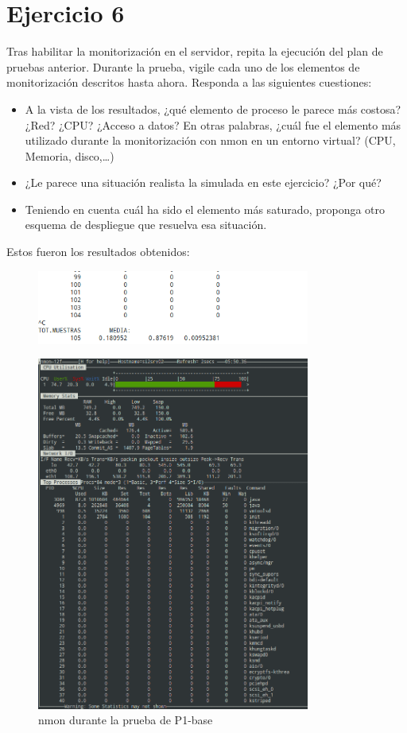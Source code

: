 \documentclass[a4paper, 10pt]{article}
\begin{document}
\section{Ejercicio 6}
\begin{mdframed} 
Tras habilitar la monitorización en el servidor, repita la ejecución del plan de pruebas 
anterior. Durante la prueba, vigile cada uno de los elementos de monitorización descritos hasta 
ahora. Responda a las siguientes cuestiones: 
\begin{itemize}
\item A la vista de los resultados, ¿qué elemento de proceso le parece más costosa? ¿Red? ¿CPU? 
¿Acceso a datos? En otras palabras, ¿cuál fue el elemento más utilizado durante la monitorización 
con nmon en un entorno virtual? (CPU, Memoria, disco,…) 
\item ¿Le parece una situación realista la simulada en este ejercicio? ¿Por qué? 
\item Teniendo en cuenta cuál ha sido el elemento más saturado, proponga otro esquema de despliegue 
que resuelva esa situación.
\end{itemize}
\end{mdframed}
Estos fueron los resultados obtenidos:
\begin{figure}[hbtp]
	 	\centering
	 	\includegraphics[width=0.8\textwidth]{../../p2/pantallazos/si2_monitor_ej6.png}
	 	\caption{}
\end{figure}
\begin{figure}[hbtp]
	 	\centering
	 	\includegraphics[width=0.8\textwidth]{../../p2/pantallazos/nmon_ej_6_mejor.png}
	 	\caption{nmon durante la prueba de P1-base}
\end{figure}
\end{document}
